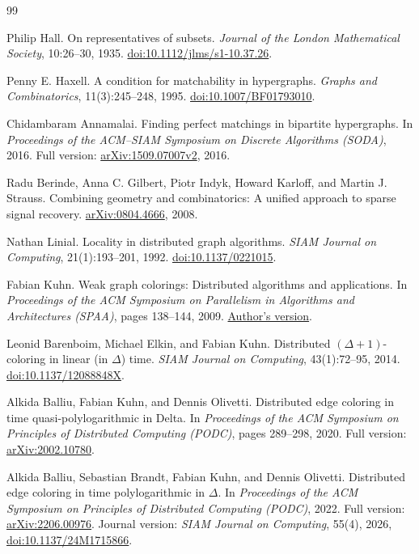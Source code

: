 \documentclass[11pt]{article}
\theoremstyle{definition}
\theoremstyle{remark}
\begin{document}
{}
\begingroup\small
\begin{thebibliography}{99}

Philip Hall.
On representatives of subsets.
\emph{Journal of the London Mathematical Society}, 10:26--30, 1935.
\href{https://doi.org/10.1112/jlms/s1-10.37.26}{doi:10.1112/jlms/s1-10.37.26}.

Penny E. Haxell.
A condition for matchability in hypergraphs.
\emph{Graphs and Combinatorics}, 11(3):245--248, 1995.
\href{https://doi.org/10.1007/BF01793010}{doi:10.1007/BF01793010}.

Chidambaram Annamalai.
Finding perfect matchings in bipartite hypergraphs.
In \emph{Proceedings of the ACM--SIAM Symposium on Discrete Algorithms
(SODA)}, 2016.
Full version: \href{https://arxiv.org/abs/1509.07007v2}{arXiv:1509.07007v2}, 2016.

Radu Berinde, Anna C. Gilbert, Piotr Indyk, Howard Karloff, and Martin J. Strauss.
Combining geometry and combinatorics: A unified approach to sparse signal recovery.
\href{https://arxiv.org/abs/0804.4666}{arXiv:0804.4666}, 2008.

Nathan Linial.
Locality in distributed graph algorithms.
\emph{SIAM Journal on Computing}, 21(1):193--201, 1992.
\href{https://doi.org/10.1137/0221015}{doi:10.1137/0221015}.

Fabian Kuhn.
Weak graph colorings: Distributed algorithms and applications.
In \emph{Proceedings of the ACM Symposium on Parallelism in Algorithms
and Architectures (SPAA)}, pages 138--144, 2009.
\href{https://people.csail.mit.edu/fkuhn/publications/spaa09b.pdf}{Author's version}.

Leonid Barenboim, Michael Elkin, and Fabian Kuhn.
Distributed $(\Delta+1)$-coloring in linear (in $\Delta$) time.
\emph{SIAM Journal on Computing}, 43(1):72--95, 2014.
\href{https://doi.org/10.1137/12088848X}{doi:10.1137/12088848X}.

Alkida Balliu, Fabian Kuhn, and Dennis Olivetti.
Distributed edge coloring in time quasi-polylogarithmic in Delta.
In \emph{Proceedings of the ACM Symposium on Principles of Distributed
Computing (PODC)}, pages 289--298, 2020.
Full version: \href{https://arxiv.org/abs/2002.10780}{arXiv:2002.10780}.

Alkida Balliu, Sebastian Brandt, Fabian Kuhn, and Dennis Olivetti.
Distributed edge coloring in time polylogarithmic in $\Delta$.
In \emph{Proceedings of the ACM Symposium on Principles of Distributed
Computing (PODC)}, 2022.
Full version: \href{https://arxiv.org/abs/2206.00976}{arXiv:2206.00976}.
Journal version: \emph{SIAM Journal on Computing}, 55(4), 2026,
\href{https://doi.org/10.1137/24M1715866}{doi:10.1137/24M1715866}.


\end{thebibliography}
\end{document}
